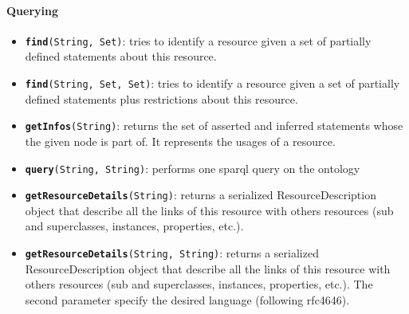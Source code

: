 \paragraph{Querying}
\begin{itemize}

    \item {\tt {\bf find}(String, Set)}: tries to identify a resource given a
    set of partially defined statements about this resource.

    \item {\tt {\bf find}(String, Set, Set)}: tries to identify a resource
    given a set of partially defined statements plus restrictions about this
    resource.

    \item {\tt {\bf getInfos}(String)}: returns the set of asserted and
    inferred statements whose the given node is part of. It represents the
    usages of a resource.

    \item {\tt {\bf query}(String, String)}: performs one sparql query on the
    ontology

    \item {\tt {\bf getResourceDetails}(String)}: returns a serialized
    ResourceDescription object that describe all the links of this resource
    with others resources (sub and superclasses, instances, properties, etc.).

    \item {\tt {\bf getResourceDetails}(String, String)}: returns a serialized
    ResourceDescription object that describe all the links of this resource
    with others resources (sub and superclasses, instances, properties, etc.).
    The second parameter specify the desired language (following rfc4646).
\end{itemize}

